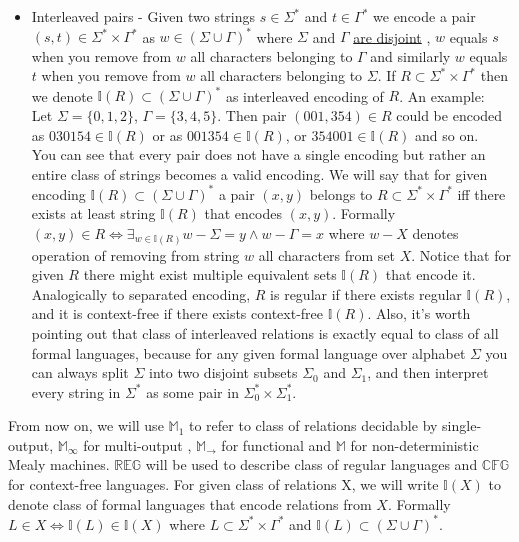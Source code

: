 \documentclass[12pt]{article}
\begin{document}
\begin{itemize}
	\item Interleaved pairs - Given two strings $s \in \Sigma^*$ and $t \in \Gamma^*$ we encode a pair $(s,t) \in \Sigma^* \times \Gamma^*$ as $w \in (\Sigma \cup \Gamma)^* $ where $\Sigma$ and $\Gamma$ \underline{are disjoint} , $w$ equals $s$ when you remove from $w$ all characters belonging to $\Gamma$ and similarly $w$ equals $t$ when you remove from $w$ all characters belonging to $\Sigma$. If $R \subset  \Sigma^* \times \Gamma^*$ then we denote $\mathbb{I}(R) \subset (\Sigma \cup \Gamma)^*$ as interleaved encoding of $R$. An example:\\
	Let $\Sigma = \{0,1,2\}$, $\Gamma = \{3,4,5\}$. Then pair $(001,354) \in R$ could be encoded as $030154 \in \mathbb{I}(R)$ or as $001354 \in \mathbb{I}(R)$, or $354001 \in \mathbb{I}(R)$ and so on. \\
	You can see that every pair does not have a single encoding but rather an entire class of strings becomes a valid encoding. We will say that for given encoding $\mathbb{I}(R) \subset (\Sigma \cup \Gamma)^*$ a pair $(x,y)$ belongs to $R \subset \Sigma^* \times \Gamma^*$ iff there exists at least string $\mathbb{I}(R)$ that encodes $(x,y)$. Formally $(x,y) \in R \iff \exists_{w\in\mathbb{I}(R)} w - \Sigma = y \wedge w - \Gamma = x$ where $w-X$ denotes operation of removing from string $w$ all characters from set $X$. Notice that for given $R$ there might exist multiple equivalent sets $\mathbb{I}(R)$ that encode it. Analogically to separated encoding, $R$ is regular if there exists regular $\mathbb{I}(R)$, and it is context-free if there exists context-free $\mathbb{I}(R)$. Also, it's worth pointing out that class of interleaved relations is exactly equal to class of all formal languages, because for any given formal language over alphabet $\Sigma$ you can always split $\Sigma$ into two disjoint subsets $\Sigma_0$ and $\Sigma_1$, and then interpret every string in $\Sigma^*$ as some pair in $\Sigma_0^* \times \Sigma_1^*$.
\end{itemize}
 
From now on, we will use $\mathbb{M}_1$ to refer to class of relations decidable by single-output, $\mathbb{M}_\infty$ for multi-output , $\mathbb{M}_\rightarrow$ for functional and $\mathbb{M}$ for non-deterministic Mealy machines. $\mathbb{REG}$ will be used to describe class of regular languages  and $\mathbb{CFG}$ for context-free languages. For given class of relations X, we will write $\mathbb{I}(X)$ to denote class of formal languages that encode relations from $X$. Formally $L  \in X \iff \mathbb{I}(L)  \in \mathbb{I}(X)$ where $L \subset \Sigma^* \times \Gamma^*$ and $\mathbb{I}(L) \subset (\Sigma \cup \Gamma)^*$. 
 
\end{document}
